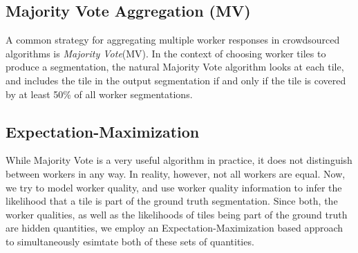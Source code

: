 
\subsection{Majority Vote Aggregation (MV)}
A common strategy for aggregating multiple worker responses in crowdsourced algorithms is {\em Majority Vote}(MV). In the context of choosing worker tiles to produce a segmentation, the natural Majority Vote algorithm looks at each tile, and includes the tile in the output segmentation if and only if the tile is covered by at least 50\% of all worker segmentations.

\subsection{Expectation-Maximization}
While Majority Vote is a very useful algorithm in practice, it does not distinguish between workers in any way. In reality, however, not all workers are equal. Now, we try to model worker quality, and use worker quality information to infer the likelihood that a tile is part of the ground truth segmentation. 
Since both, the worker qualities, as well as the likelihoods of tiles being part of the ground truth are hidden quantities, we employ an Expectation-Maximization based approach to simultaneously esimtate both of these sets of quantities. 

